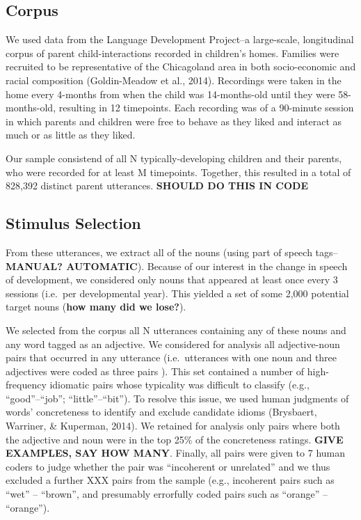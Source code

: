 \documentclass[10pt, letterpaper]{article}
\begin{document}
\hypertarget{corpus}{%
\subsection{Corpus}\label{corpus}}

We used data from the Language Development Project--a large-scale,
longitudinal corpus of parent child-interactions recorded in children's
homes. Families were recruited to be representative of the Chicagoland
area in both socio-economic and racial composition (Goldin-Meadow et
al., 2014). Recordings were taken in the home every 4-months from when
the child was 14-months-old until they were 58-months-old, resulting in
12 timepoints. Each recording was of a 90-minute session in which
parents and children were free to behave as they liked and interact as
much or as little as they liked.

Our sample consistend of all N typically-developing children and their
parents, who were recorded for at least M timepoints. Together, this
resulted in a total of 828,392 distinct parent utterances.
\textbf{SHOULD DO THIS IN CODE}

\hypertarget{stimulus-selection}{%
\subsection{Stimulus Selection}\label{stimulus-selection}}

From these utterances, we extract all of the nouns (using part of speech
tags--\textbf{MANUAL? AUTOMATIC}). Because of our interest in the change
in speech of development, we considered only nouns that appeared at
least once every 3 sessions (i.e.~per developmental year). This yielded
a set of some 2,000 potential target nouns (\textbf{how many did we
lose?}).

We selected from the corpus all N utterances containing any of these
nouns and any word tagged as an adjective. We considered for analysis
all adjective-noun pairs that occurred in any utterance (i.e.~utterances
with one noun and three adjectives were coded as three pairs ). This set
contained a number of high-frequency idiomatic pairs whose typicality
was difficult to classify (e.g., ``good''--``job'';
``little''--``bit''). To resolve this issue, we used human judgments of
words' concreteness to identify and exclude candidate idioms (Brysbaert,
Warriner, \& Kuperman, 2014). We retained for analysis only pairs where
both the adjective and noun were in the top 25\% of the concreteness
ratings. \textbf{GIVE EXAMPLES, SAY HOW MANY}. Finally, all pairs were
given to 7 human coders to judge whether the pair was ``incoherent or
unrelated'' and we thus excluded a further XXX pairs from the sample
(e.g., incoherent pairs such as ``wet'' -- ``brown'', and presumably
errorfully coded pairs such as ``orange'' -- ``orange'').
\end{document}

